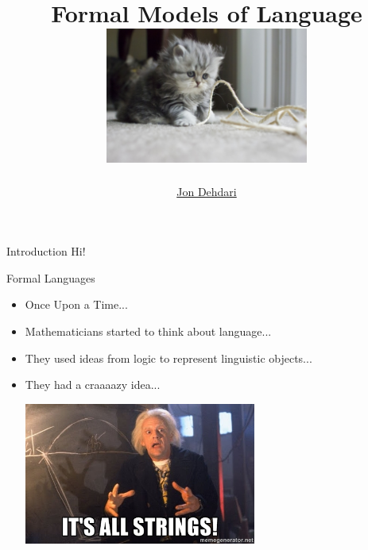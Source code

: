 \documentclass{beamer}
\begin{document}
\title{Formal Models of Language \\[1.5em]
 \includegraphics[width=0.5\textwidth]{images/kitten_string_flickr_albaraa.jpg} \\[-1.0em]
 }
\author{\href{http://jon.dehdari.org}{Jon Dehdari}}
\frame{\titlepage}

\begin{frame}{Introduction}
Hi!
\end{frame}

\begin{frame}{Formal Languages}
\begin{block}{}
\begin{itemize}
	\item Once Upon a Time...
	\pause
	\item Mathematicians started to think about language...
	\pause
	\item They used ideas from logic to represent linguistic objects...
	\pause
	\item They had a craaaazy idea... \\
	\pause
	\begin{center}
	\includegraphics[width=0.6\textwidth]{images/doc_brown_strings.jpg}
	\end{center}
\end{itemize}
\end{block}
\end{frame}
\end{document}
